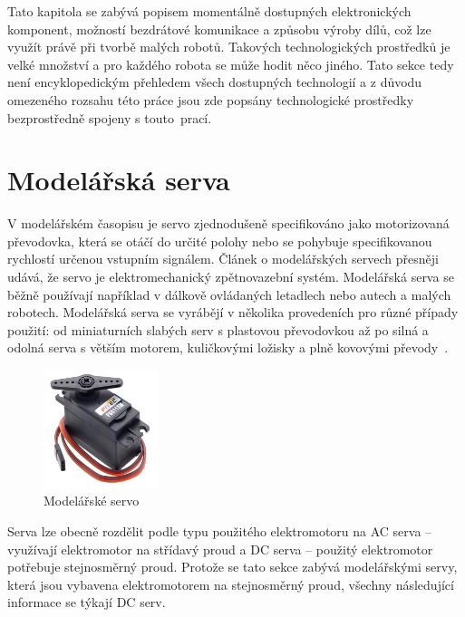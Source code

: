 Tato kapitola se zabývá popisem momentálně dostupných elektronických komponent, možností bezdrátové komunikace a způsobu výroby dílů, což lze využít právě při tvorbě malých robotů. Takových technologických prostředků je velké množství a pro každého robota se může hodit něco jiného. Tato sekce tedy není encyklopedickým přehledem všech dostupných technologií a z důvodu omezeného rozsahu této práce jsou zde popsány technologické prostředky bezprostředně spojeny s touto~prací.


\section{Modelářská serva}

V modelářském časopisu \cite{ServoMagazine} je servo zjednodušeně specifikováno jako motorizovaná převodovka, která se otáčí do určité polohy nebo se pohybuje specifikovanou rychlostí určenou vstupním signálem. Článek o modelářských servech \cite{HobbyServos} přesněji udává, že servo je elektromechanický zpětnovazební systém. Modelářská serva se běžně používají například v dálkově ovládaných letadlech nebo autech a malých robotech. Modelářská serva se vyrábějí v několika provedeních pro různé případy použití: od miniaturních slabých serv s plastovou převodovkou až po silná a odolná serva s větším motorem, kuličkovými ložisky a plně kovovými převody~\cite{HobbyServos}.

\begin{figure}[hbt]
	\centering
	\includegraphics[width=0.3\textwidth]{obrazky-figures/servo1.jpg}
	\caption[servo]{Modelářské servo\footnotemark}
	\label{servo1}
\end{figure}

Serva lze obecně rozdělit podle typu použitého elektromotoru na AC serva -- využívají elektromotor na střídavý proud a DC serva -- použitý elektromotor potřebuje stejnosměrný proud. Protože se tato sekce zabývá modelářskými servy, která jsou vybavena elektromotorem na stejnosměrný proud, všechny následující informace se týkají DC serv.

